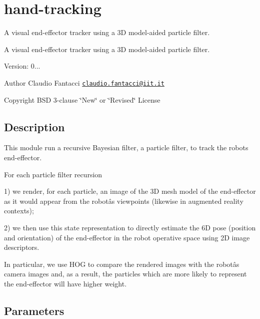 \hypertarget{group__hand-tracking}{}\section{hand-\/tracking}
\label{group__hand-tracking}


A visual end-\/effector tracker using a 3D model-\/aided particle filter.  


A visual end-\/effector tracker using a 3D model-\/aided particle filter. 

Version\+: 0... \begin{DoxyAuthor}{Author}
Claudio Fantacci \href{mailto:claudio.fantacci@iit.it}{\tt claudio.\+fantacci@iit.\+it} ~\newline
 
\end{DoxyAuthor}
\begin{DoxyCopyright}{Copyright}
B\+SD 3-\/clause \char`\"{}\+New\char`\"{} or \char`\"{}\+Revised\char`\"{} License 
\end{DoxyCopyright}
\hypertarget{group__visualservoingserver_intro_sec}{}\subsection{Description}\label{group__visualservoingserver_intro_sec}
This module run a recursive Bayesian filter, a particle filter, to track the robot\textquotesingle{}s end-\/effector.

For each particle filter recursion

1) we render, for each particle, an image of the 3D mesh model of the end-\/effector as it would appear from the robotâs viewpoints (likewise in augmented reality contexts);

2) we then use this state representation to directly estimate the 6D pose (position and orientation) of the end-\/effector in the robot operative space using 2D image descriptors.

In particular, we use H\+OG to compare the rendered images with the robotâs camera images and, as a result, the particles which are more likely to represent the end-\/effector will have higher weight.\hypertarget{group__visualservoingserver_parameters_sec}{}\subsection{Parameters}\label{group__visualservoingserver_parameters_sec}

